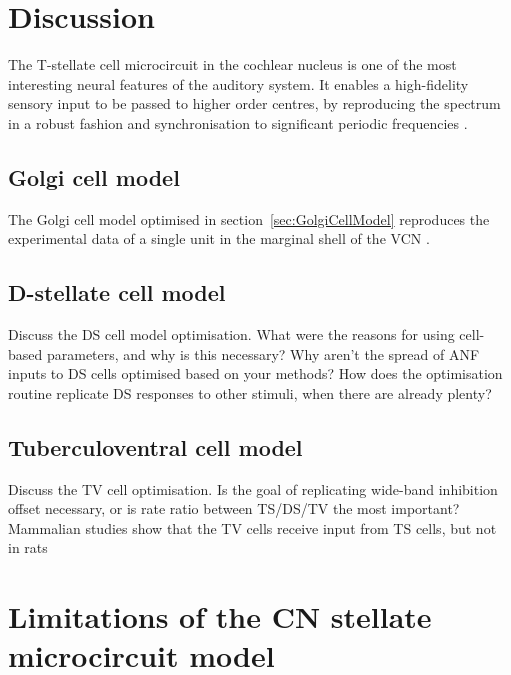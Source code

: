 \section{Discussion}

The T-stellate cell microcircuit in the
cochlear nucleus is one of the most interesting neural features of the
auditory system.  It enables a high-fidelity sensory input to be
passed to higher order centres, by reproducing the spectrum in a
robust fashion \citep{BlackburnSachs:1990,May:2003} and
synchronisation to significant periodic frequencies
\citep{KeilsonRichardsEtAl:1997}.

\medskip{} 

\subsection{Golgi cell model}
 The Golgi cell model optimised in section~\ref{sec:GolgiCellModel} reproduces the experimental data of a single
unit in the marginal shell of the VCN \citep{GhoshalKim:1997}.

\medskip{}
\subsection{D-stellate cell model}
Discuss the DS cell model optimisation.  What were the reasons for
using cell-based parameters, and why is this necessary?  Why aren't
the spread of ANF inputs to DS cells optimised based on your methods?
How does the optimisation routine replicate DS responses to other
stimuli, when there are already plenty?

\medskip{}
\subsection{Tuberculoventral cell model}
Discuss the TV cell optimisation. Is the goal of replicating wide-band
inhibition offset necessary, or is rate ratio between TS/DS/TV the
most important?  Mammalian studies show that the TV cells receive
input from TS cells, but not in rats


\section{Limitations of the CN stellate microcircuit model}

